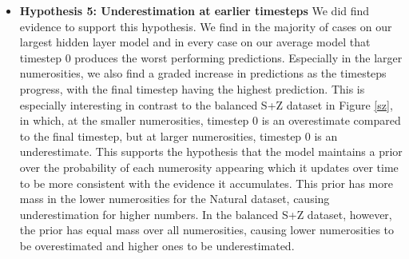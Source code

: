 \documentclass{article}
\begin{document}
\begin{itemize}
    \item \textbf{Hypothesis 5: Underestimation at earlier timesteps}\newline
    We did find evidence to support this hypothesis.
    We find in the majority of cases on our largest hidden layer model and in every case on our average model that timestep 0 produces the worst performing predictions. Especially in the larger numerosities, we also find a graded increase in predictions as the timesteps progress, with the final timestep having the highest prediction. \newline
    This is especially interesting in contrast to the balanced S+Z dataset in Figure \ref{sz}, in which, at the smaller numerosities, timestep 0 is an overestimate compared to the final timestep, but at larger numerosities, timestep 0 is an underestimate. This supports the hypothesis that the model maintains a prior over the probability of each numerosity appearing which it updates over time to be more consistent with the evidence it accumulates. This prior has more mass in the lower numerosities for the Natural dataset, causing underestimation for higher numbers. In the balanced S+Z dataset, however, the prior has equal mass over all numerosities, causing lower numerosities to be overestimated and higher ones to be underestimated.
\end{itemize}
\end{document}
